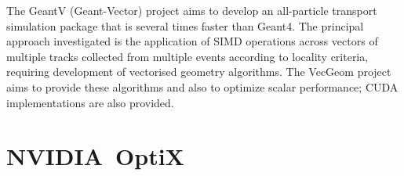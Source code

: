 \documentclass[a4paper]{jpconf}
\begin{document}
The GeantV\cite{GeantV} (Geant-Vector) project aims 
to develop an all-particle transport simulation package that is 
several times faster than Geant4. The principal approach investigated 
is the application of SIMD operations across vectors of multiple tracks 
collected from multiple events according to locality criteria, requiring
development of vectorised geometry algorithms.  
The VecGeom\cite{VecGeom} project aims to provide these algorithms and also 
to optimize scalar performance; CUDA implementations are also provided.
%

%
%
%
%
%
%



\section{NVIDIA\textregistered\ OptiX\texttrademark}
\end{document}
